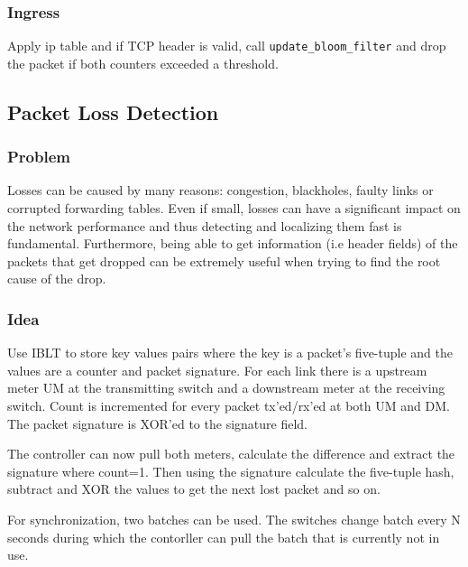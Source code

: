 \documentclass[a4paper, fontsize=8pt, landscape, DIV=1]{scrartcl}
\begin{document}
\begin{multicols*}{4}
  \subsubsection{Ingress} 
  Apply ip table and if TCP header is valid, call \texttt{update\_bloom\_filter} and drop the
  packet if both counters exceeded a threshold.


  \subsection{Packet Loss Detection}
  \subsubsection{Problem}
  Losses can be caused by many reasons: congestion, blackholes, faulty links or corrupted
  forwarding tables. Even if small, losses can have a significant impact on the network 
  performance and thus detecting and localizing them fast is fundamental. Furthermore, being 
  able to get information (i.e header fields) of the packets that get dropped can be 
  extremely useful when trying to find the root cause of the drop.

  \subsubsection{Idea}
  Use IBLT to store key values pairs where the key is a packet's five-tuple and the values are
  a counter and packet signature. For each link there is a upstream meter UM at the transmitting
  switch and a downstream meter at the receiving switch. Count is incremented for every packet
  tx'ed/rx'ed at both UM and DM. The packet signature is XOR'ed to the signature field. 

  The controller can now pull both meters, calculate the difference and extract the signature
  where count=1. Then using the signature calculate the five-tuple hash, subtract and XOR
  the values to get the next lost packet and so on.

  For synchronization, two batches can be used. The switches change batch every N seconds
  during which the contorller can pull the batch that is currently not in use.
    

  \end{multicols*}
\end{document}
